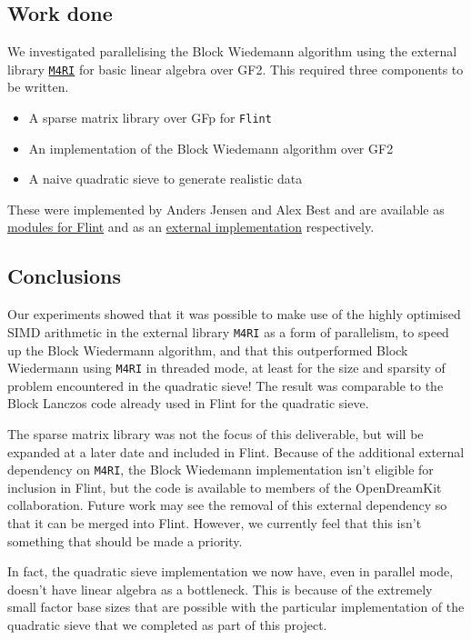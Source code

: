 \subsection{Work done}\label{work-done}

We investigated parallelising the Block Wiedemann algorithm using the
external library \href{https://bitbucket.org/malb/m4ri}{\texttt{M4RI}}
for basic linear algebra over GF2. This required three components to be
written.

\begin{itemize}
\tightlist
\item
  A sparse matrix library over GFp for \texttt{Flint}
\item
  An implementation of the Block Wiedemann algorithm over GF2
\item
  A naive quadratic sieve to generate realistic data
\end{itemize}

These were implemented by Anders Jensen and Alex Best and are available
as
\href{https://github.com/alexjbest/flint2/tree/nmod_sparse_mat/nmod_sparse_mat}{modules
for Flint} and as an \href{https://github.com/alexjbest/bw}{external
implementation} respectively.

\subsection{Conclusions}\label{conclusions}

Our experiments showed that it was possible to make use of the highly
optimised SIMD arithmetic in the external library \texttt{M4RI} as a
form of parallelism, to speed up the Block Wiedermann algorithm, and
that this outperformed Block Wiedermann using \texttt{M4RI} in threaded
mode, at least for the size and sparsity of problem encountered in the
quadratic sieve! The result was comparable to the Block Lanczos code
already used in Flint for the quadratic sieve.

The sparse matrix library was not the focus of this deliverable, but
will be expanded at a later date and included in Flint. Because of the
additional external dependency on \texttt{M4RI}, the Block Wiedemann
implementation isn't eligible for inclusion in Flint, but the code is
available to members of the OpenDreamKit collaboration. Future work may
see the removal of this external dependency so that it can be merged
into Flint. However, we currently feel that this isn't something that
should be made a priority.

In fact, the quadratic sieve implementation we now have, even in
parallel mode, doesn't have linear algebra as a bottleneck. This is
because of the extremely small factor base sizes that are possible with
the particular implementation of the quadratic sieve that we completed
as part of this project.
